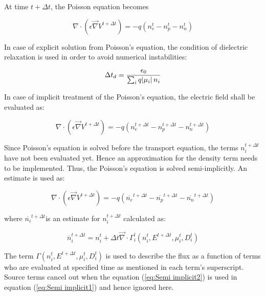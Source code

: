 \documentclass[paper=a4, fontsize=13pt]{scrartcl}
\begin{document}

At time $t+\Delta t$, the Poisson equation becomes 

\begin{equation}
\nabla \cdot ( \epsilon \vec{\nabla} V^{t+\Delta t}) = - q(n_e^t - n_p^t - n_n^t)
\end{equation}


In case of explicit solution from Poisson's equation, the condition of dielectric relaxation is used in order to avoid numerical instabilities:

\begin{equation}
\Delta t_d = \frac{\epsilon_0}{\sum_{i} q \abs{\mu_i}n_i}
\end{equation}

In case of implicit treatment of the Poisson's equation, the electric field shall be evaluated as:

\begin{equation}
\nabla \cdot ( \epsilon \vec{\nabla} V^{t+\Delta t}) = - q(n_e^{t+\Delta t} - n_p^{t+\Delta t} - n_n^{t+\Delta t})
\end{equation}

Since Poisson's equation is solved before the transport equation, the terms $n_i^{t+\Delta t}$ have not been evaluated yet. Hence an approximation for the density term needs to be implemented. Thus, the Poisson's equation is solved semi-implicitly. An estimate is used as:

\begin{equation}\label{eq:Semi implicit1}
\nabla \cdot ( \epsilon \vec{\nabla} V^{t+\Delta t}) = - q(\overline{n_e}^{t+\Delta t} - \overline{n_p}^{t+\Delta t} - \overline{n_n}^{t+\Delta t})
\end{equation}

where $\overline{n_i}^{t+\Delta t}$is an estimate for $n_i^{t+\Delta t}$ calculated as:

\begin{equation}\label{eq:Semi implicit2}
\overline{n}_i^{t+\Delta t} = n_i^t + \Delta t \vec{\nabla} \cdot \Gamma^{l}_{i} (n_i^{t}, E^{t+\Delta t}, \mu_i^{t}, D_i^{t})
\end{equation}

The term $\Gamma (n_i^{t}, E^{t+\Delta t}, \mu_i^{t}, D_i^{t})$ is used to describe the flux as a function of terms who are evaluated at specified time as mentioned in each term's superscript. Source terms cancel out when the equation (\ref{eq:Semi implicit2}) is used in equation (\ref{eq:Semi implicit1}) and hence ignored here.
\end{document}
